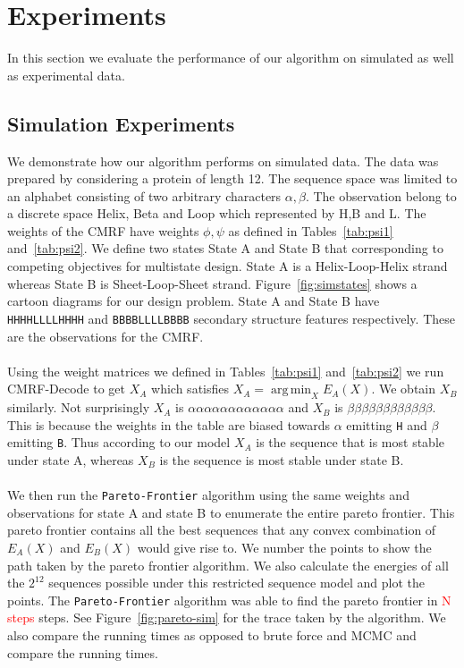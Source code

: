 \documentclass{article}
\DeclareMathOperator*{\argmin}{arg\,min}
\begin{document}
\section{Experiments}
In this section we evaluate the performance of our algorithm on simulated as well as experimental data. 

\subsection{Simulation Experiments}
We demonstrate how our algorithm performs on simulated data. The data was prepared by considering a protein of length 12. The sequence space was limited to an alphabet consisting of two arbitrary characters $\alpha,\beta$. The observation belong to a discrete space Helix, Beta and Loop which represented by H,B and L. The weights of the CMRF have weights $\phi,\psi$ as defined in Tables~\ref{tab:psi1} and~\ref{tab:psi2}. We define two states State A and State B that corresponding to competing objectives for multistate design. State A is a Helix-Loop-Helix strand whereas State B is Sheet-Loop-Sheet strand. Figure~\ref{fig:simstates} shows a cartoon diagrams for our design problem. State A and State B have \texttt{HHHHLLLLHHHH} and \texttt{BBBBLLLLBBBB} secondary structure features respectively. These are the observations for the CMRF.
\\
\\
Using the weight matrices we defined in Tables~\ref{tab:psi1} and~\ref{tab:psi2} we run CMRF-Decode to get $X_A$ which satisfies $X_A = \argmin_X E_A(X)$. We obtain $X_B$ similarly. Not surprisingly $X_A$ is $\alpha\alpha\alpha\alpha\alpha\alpha\alpha\alpha\alpha\alpha\alpha\alpha$ 
and $X_B$ is $\beta\beta\beta\beta\beta\beta\beta\beta\beta\beta\beta\beta$. This is because the weights in the table are biased towards $\alpha$ emitting \texttt{H} and $\beta$ emitting \texttt{B}. Thus according to our model $X_A$ is the sequence that is most stable under state A, whereas $X_B$ is the sequence is most stable under state B.
\\
\\
We then run the \texttt{Pareto-Frontier} algorithm using the same weights and observations for state A and state B to enumerate the entire pareto frontier. This pareto frontier contains all the best sequences that any convex combination of $E_A(X)$ and $E_B(X)$ would give rise to. We number the points to show the path taken by the pareto frontier algorithm. We also calculate the energies of all the $2^{12}$ sequences possible under this restricted sequence model and plot the points. The \texttt{Pareto-Frontier} algorithm was able to find the pareto frontier in \textcolor{red}{N steps} steps. See Figure~\ref{fig:pareto-sim} for the trace taken by the algorithm.  We also compare the running times as opposed to brute force and MCMC and compare the running times. 
\end{document}

